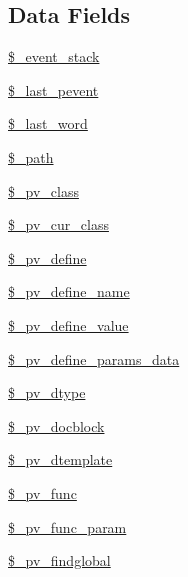 \subsection*{\-Data \-Fields}
\begin{DoxyCompactItemize}
\item 
\hyperlink{classphp_documentor_t_parser_a1a5f59e70caa643d4390023469b1a7c8}{\$\-\_\-event\-\_\-stack}
\item 
\hyperlink{classphp_documentor_t_parser_afbe9ac112fade65fc4a2eb649feedf5e}{\$\-\_\-last\-\_\-pevent}
\item 
\hyperlink{classphp_documentor_t_parser_a345ee33ee73641df0d54f05e9e84f3fd}{\$\-\_\-last\-\_\-word}
\item 
\hyperlink{classphp_documentor_t_parser_a7827e5ae727e96269db2e008bbfb9773}{\$\-\_\-path}
\item 
\hyperlink{classphp_documentor_t_parser_aca946c4e206f7368d3ab6ec90417c088}{\$\-\_\-pv\-\_\-class}
\item 
\hyperlink{classphp_documentor_t_parser_a156cbb652fd0e1d944579d772c0ab12f}{\$\-\_\-pv\-\_\-cur\-\_\-class}
\item 
\hyperlink{classphp_documentor_t_parser_a2244a03f56f359e9af735e77f1ba3506}{\$\-\_\-pv\-\_\-define}
\item 
\hyperlink{classphp_documentor_t_parser_a75695f40aeff05ab37b892bfdee6f73f}{\$\-\_\-pv\-\_\-define\-\_\-name}
\item 
\hyperlink{classphp_documentor_t_parser_a620284a43c42bbdf10b0060e3902fd08}{\$\-\_\-pv\-\_\-define\-\_\-value}
\item 
\hyperlink{classphp_documentor_t_parser_aef5256ea3b0218efed02e3ecdd111521}{\$\-\_\-pv\-\_\-define\-\_\-params\-\_\-data}
\item 
\hyperlink{classphp_documentor_t_parser_ab3806c098e056d74eb80f0127c369f1e}{\$\-\_\-pv\-\_\-dtype}
\item 
\hyperlink{classphp_documentor_t_parser_a9e4c6cec7cb6a131aa1d64680caf2afa}{\$\-\_\-pv\-\_\-docblock}
\item 
\hyperlink{classphp_documentor_t_parser_a285853e7c973de440bc4ba4abcbdabc8}{\$\-\_\-pv\-\_\-dtemplate}
\item 
\hyperlink{classphp_documentor_t_parser_a951809946826f564f1fe9d448e54138f}{\$\-\_\-pv\-\_\-func}
\item 
\hyperlink{classphp_documentor_t_parser_aaadc4ebf8cb7e8344a601180785dbb67}{\$\-\_\-pv\-\_\-func\-\_\-param}
\item 
\hyperlink{classphp_documentor_t_parser_a86a9d8a99c52e7b23bdad628e991d0ad}{\$\-\_\-pv\-\_\-findglobal}

\end{DoxyCompactItemize}
